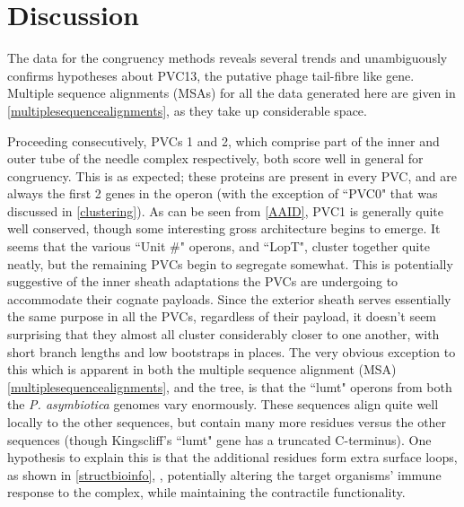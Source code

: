 \section{Discussion}
The data for the congruency methods reveals several trends and unambiguously confirms hypotheses about PVC13, the putative phage tail-fibre like gene. Multiple sequence alignments (MSAs) for all the data generated here are given in \vref{multiplesequencealignments}, as they take up considerable space. 

Proceeding consecutively, PVCs 1 and 2, which comprise part of the inner and outer tube of the needle complex respectively, both score well in general for congruency. This is as expected; these proteins are present in every PVC, and are always the first 2 genes in the operon (with the exception of ``PVC0" that was discussed in \vref{clustering}). As can be seen from \vref{AAID}, PVC1 is generally quite well conserved, though some interesting gross architecture begins to emerge. It seems that the various ``Unit \#" operons, and ``LopT", cluster together quite neatly, but the remaining PVCs begin to segregate somewhat. This is potentially suggestive of the inner sheath adaptations the PVCs are undergoing to accommodate their cognate payloads. Since the exterior sheath serves essentially the same purpose in all the PVCs, regardless of their payload, it doesn't seem surprising that they almost all cluster considerably closer to one another, with short branch lengths and low bootstraps in places. The very obvious exception to this which is apparent in both the multiple sequence alignment (MSA) \vref{multiplesequencealignments}, and the tree, is that the ``lumt" operons from both the \emph{P. asymbiotica} genomes vary enormously. These sequences align quite well locally to the other sequences, but contain many more residues versus the other sequences (though Kingscliff's ``lumt" gene has a truncated C-terminus). One hypothesis to explain this is that the additional residues form extra surface loops, as shown in \vref{structbioinfo}, , potentially altering the target organisms' immune response to the complex, while maintaining the contractile functionality.


